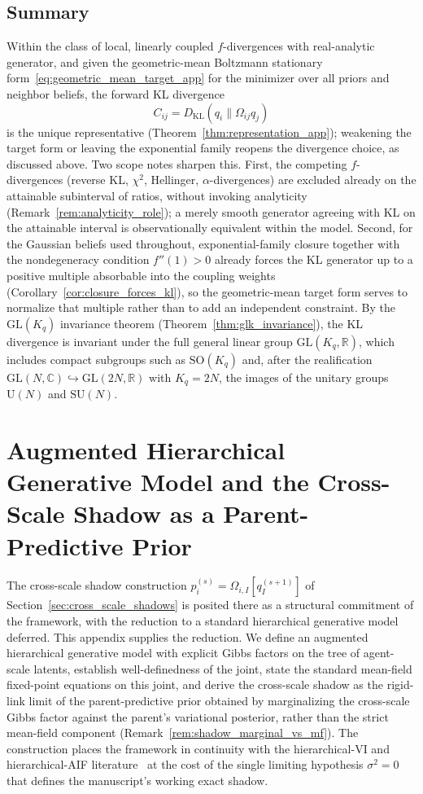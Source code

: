 \documentclass[11pt]{article}
\begin{document}
\subsection*{Summary}
Within the class of local, linearly coupled $f$-divergences with real-analytic generator, and given the geometric-mean Boltzmann stationary form~\eqref{eq:geometric_mean_target_app} for the minimizer over all priors and neighbor beliefs, the forward KL divergence
\[
\boxed{
C_{ij}=D_{\mathrm{KL}}(q_i \| \Omega_{ij} q_j)}
\]
is the unique representative (Theorem~\ref{thm:representation_app}); weakening the target form or leaving the exponential family reopens the divergence choice, as discussed above. Two scope notes sharpen this. First, the competing $f$-divergences (reverse KL, $\chi^2$, Hellinger, $\alpha$-divergences) are excluded already on the attainable subinterval of ratios, without invoking analyticity (Remark~\ref{rem:analyticity_role}); a merely smooth generator agreeing with KL on the attainable interval is observationally equivalent within the model. Second, for the Gaussian beliefs used throughout, exponential-family closure together with the nondegeneracy condition $f''(1) > 0$ already forces the KL generator up to a positive multiple absorbable into the coupling weights (Corollary~\ref{cor:closure_forces_kl}), so the geometric-mean target form serves to normalize that multiple rather than to add an independent constraint. By the $\mathrm{GL}(K_q)$ invariance theorem (Theorem~\ref{thm:glk_invariance}), the KL divergence is invariant under the full general linear group $\mathrm{GL}(K_q, \mathbb{R})$, which includes compact subgroups such as $\mathrm{SO}(K_q)$ and, after the realification $\mathrm{GL}(N, \mathbb{C}) \hookrightarrow \mathrm{GL}(2N, \mathbb{R})$ with $K_q = 2N$, the images of the unitary groups $\mathrm{U}(N)$ and $\mathrm{SU}(N)$.

\section{Augmented Hierarchical Generative Model and the Cross-Scale Shadow as a Parent-Predictive Prior}
\label{app:augmented_joint}

The cross-scale shadow construction $p_i^{(s)} = \Omega_{i,I}[q_I^{(s+1)}]$ of Section~\ref{sec:cross_scale_shadows} is posited there as a structural commitment of the framework, with the reduction to a standard hierarchical generative model deferred. This appendix supplies the reduction. We define an augmented hierarchical generative model with explicit Gibbs factors on the tree of agent-scale latents, establish well-definedness of the joint, state the standard mean-field fixed-point equations on this joint, and derive the cross-scale shadow as the rigid-link limit of the parent-predictive prior obtained by marginalizing the cross-scale Gibbs factor against the parent's variational posterior, rather than the strict mean-field component (Remark~\ref{rem:shadow_marginal_vs_mf}). The construction places the framework in continuity with the hierarchical-VI and hierarchical-AIF literature~\cite{Friston2017, parr2022active} at the cost of the single limiting hypothesis $\sigma^2=0$ that defines the manuscript's working exact shadow.
\end{document}
